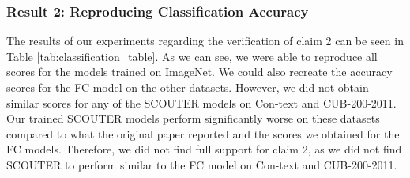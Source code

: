 
\subsubsection{Result 2: Reproducing Classification Accuracy}
The results of our experiments regarding the verification of claim 2 can be seen in Table \ref{tab:classification_table}. As we can see, we were able to reproduce all scores for the models trained on ImageNet. We could also recreate the accuracy scores for the FC model on the other datasets. However, we did not obtain similar scores for any of the SCOUTER models on Con-text and CUB-200-2011. Our trained SCOUTER models perform significantly worse on these datasets compared to what the original paper reported and the scores we obtained for the FC models. Therefore, we did not find full support for claim 2, as we did not find SCOUTER to perform similar to the FC model on Con-text and CUB-200-2011. 
\begin{table}[!h]
\centering
{}
\vspace{3mm}
\caption{Classification accuracy on various datasets. The original scores are reported in Table 3 in \cite{scouter} with ResNeSt-26 as backbone. Scores that diverge more than 0.05 from the original value are highlighted in orange. Where applicable, standard deviation is reported in parentheses.}
\label{tab:classification_table}
\end{table}


